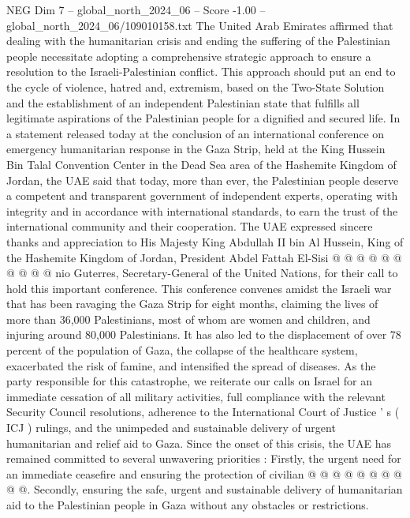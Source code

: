 \begin{textsample}{NEG Dim 7 – global\_north\_2024\_06 – Score -1.00 – global\_north\_2024\_06/109010158.txt}  \label{ex:f7_neg_375}
The United Arab Emirates affirmed that dealing with the humanitarian crisis and ending the suffering of the Palestinian people necessitate adopting a comprehensive strategic approach to ensure a resolution to the Israeli-Palestinian conflict.
This approach should put an end to the cycle of violence, hatred and, extremism, based on the Two-State Solution and the establishment of an independent Palestinian state that fulfills all legitimate aspirations of the Palestinian people for a dignified and secured life.
In a statement released today at the conclusion of an international conference on emergency humanitarian response in the Gaza Strip, held at the King Hussein Bin Talal Convention Center in the Dead Sea area of the Hashemite Kingdom of Jordan, the UAE said that today, more than ever, the Palestinian people deserve a competent and transparent government of independent experts, operating with integrity and in accordance with international standards, to earn the trust of the international community and their cooperation.
The UAE expressed sincere thanks and appreciation to His Majesty King Abdullah II bin Al Hussein, King of the Hashemite Kingdom of Jordan, President Abdel Fattah El-Sisi @ @ @ @ @ @ @ @ @ @ nio Guterres, Secretary-General of the United Nations, for their call to hold this important conference.
This conference convenes amidst the Israeli war that has been ravaging the Gaza Strip for eight months, claiming the lives of more than 36,000 Palestinians, most of whom are women and children, and injuring around 80,000 Palestinians.
It has also led to the displacement of over 78 percent of the population of Gaza, the collapse of the healthcare system, exacerbated the risk of famine, and intensified the spread of diseases.
As the party responsible for this catastrophe, we reiterate our calls on Israel for an immediate cessation of all military activities, full compliance with the relevant Security Council resolutions, adherence to the International Court of Justice ' s ( ICJ ) rulings, and the unimpeded and sustainable delivery of urgent humanitarian and relief aid to Gaza.
Since the onset of this crisis, the UAE has remained committed to several unwavering priorities : Firstly, the urgent need for an immediate ceasefire and ensuring the protection of civilian @ @ @ @ @ @ @ @ @ @.
Secondly, ensuring the safe, urgent and sustainable delivery of humanitarian aid to the Palestinian people in Gaza without any obstacles or restrictions.

\end{textsample}

